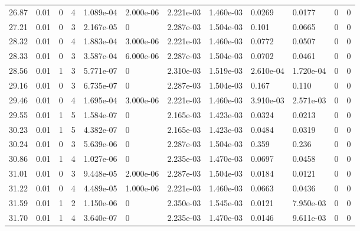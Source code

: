 \documentclass[preview]{standalone}
\begin{document}
{{{\begin{tabular}{L{1.2cm}C{1.2cm} C{0.3cm}C{0.5cm} C{1.4cm}C{1.4cm} C{1.4cm}C{1.4cm} C{1.6cm}C{1.6cm} C{1.6cm}C{1.6cm}}
  26.87  &  0.01  & 0     &  4 &  1.089e-04  & 2.000e-06  &  2.221e-03&   1.460e-03& 0.0269 & 0.0177   &  0 & 0  \\ 
  27.21  &  0.01  & 0     &  3 &  2.167e-05  & 0  &  2.287e-03&   1.504e-03& 0.101 & 0.0665   &  0 & 0  \\ 
  28.32  &  0.01  & 0     &  4 &  1.883e-04  & 3.000e-06  &  2.221e-03&   1.460e-03& 0.0772 & 0.0507   &  0 & 0  \\ 
  28.33  &  0.01  & 0     &  3 &  3.587e-04  & 6.000e-06  &  2.287e-03&   1.504e-03& 0.0702 & 0.0461   &  0 & 0  \\ 
  28.56  &  0.01  & 1     &  3 &  5.771e-07  & 0  &  2.310e-03&   1.519e-03& 2.610e-04 & 1.720e-04   &  0 & 0  \\ 
  29.16  &  0.01  & 0     &  3 &  6.735e-07  & 0  &  2.287e-03&   1.504e-03& 0.167 & 0.110   &  0 & 0  \\ 
  29.46  &  0.01  & 0     &  4 &  1.695e-04  & 3.000e-06  &  2.221e-03&   1.460e-03& 3.910e-03 & 2.571e-03   &  0 & 0  \\ 
  29.55  &  0.01  & 1     &  5 &  1.584e-07  & 0  &  2.165e-03&   1.423e-03& 0.0324 & 0.0213   &  0 & 0  \\ 
  30.23  &  0.01  & 1     &  5 &  4.382e-07  & 0  &  2.165e-03&   1.423e-03& 0.0484 & 0.0319   &  0 & 0  \\ 
  30.24  &  0.01  & 0     &  3 &  5.639e-06  & 0  &  2.287e-03&   1.504e-03& 0.359 & 0.236   &  0 & 0  \\ 
  30.86  &  0.01  & 1     &  4 &  1.027e-06  & 0  &  2.235e-03&   1.470e-03& 0.0697 & 0.0458   &  0 & 0  \\ 
  31.01  &  0.01  & 0     &  3 &  9.448e-05  & 2.000e-06  &  2.287e-03&   1.504e-03& 0.0184 & 0.0121   &  0 & 0  \\ 
  31.22  &  0.01  & 0     &  4 &  4.489e-05  & 1.000e-06  &  2.221e-03&   1.460e-03& 0.0663 & 0.0436   &  0 & 0  \\ 
  31.59  &  0.01  & 1     &  2 &  1.150e-06  & 0  &  2.350e-03&   1.545e-03& 0.0121 & 7.950e-03   &  0 & 0  \\ 
  31.70  &  0.01  & 1     &  4 &  3.640e-07  & 0  &  2.235e-03&   1.470e-03& 0.0146 & 9.611e-03   &  0 & 0  \\ 
\hline 
\end{tabular} 

}}}
\end{document}
